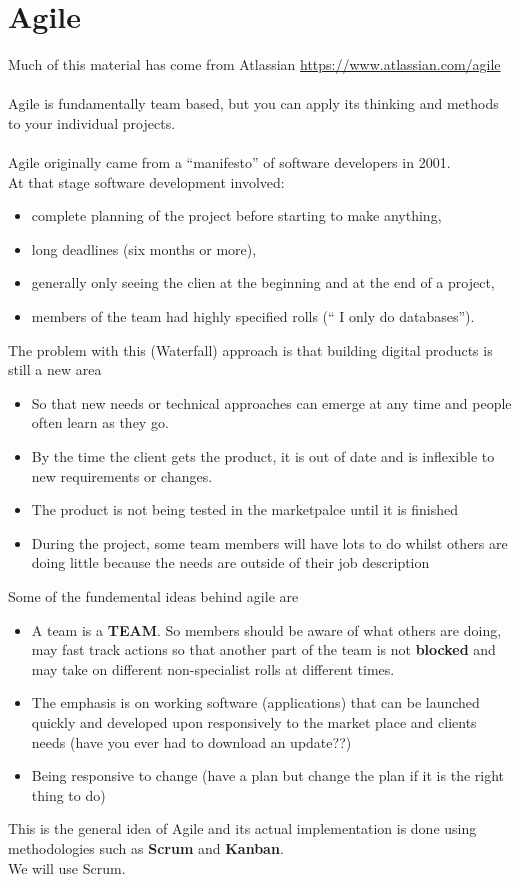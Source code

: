 \documentclass[a4paper,12pt]{article}
\begin{document}
\section{Agile}
Much of this material has come from Atlassian \url{https://www.atlassian.com/agile}\\\\
Agile is fundamentally team based, but you can apply its thinking and methods to your individual projects.\\\\
Agile originally came from a ``manifesto'' of software developers in 2001. \\
At that stage software development involved:
\begin{itemize}
	\item complete planning of the project before starting to make anything, 
	\item long deadlines (six months or more), 
	\item generally only seeing the clien at the beginning and at the end of a project,
	\item  members of the team had highly specified rolls (`` I only do databases'').
\end{itemize}
The problem with this (Waterfall) approach is that building digital products is still a new area
\begin{itemize}
	\item  So that new needs or technical approaches can emerge at any time and people often learn as they go.
	\item By the time the client gets the product, it is out of date and is inflexible to new requirements or changes.
	\item The product is not being tested in the marketpalce until it is finished
	\item During the project, some team members will have lots to do whilst others are doing little because the needs are outside of their job description
\end{itemize}
Some of the fundemental ideas behind agile are
\begin{itemize}
	\item A team is a \textbf{TEAM}. So members should be aware of what others are doing, may fast track actions so that another part of the team is not \textbf{blocked} and may take on different non-specialist rolls at different times.
	\item The emphasis is on working software (applications) that can be launched quickly and developed upon responsively to the market place and clients needs (have you ever had to download an update??)
	\item Being responsive to change (have a plan but change the plan if it is the right thing to do)
\end{itemize}
This is the general idea of Agile and its actual implementation is done using methodologies such as \textbf{Scrum} and \textbf{Kanban}.\\
We will use Scrum.
\end{document}
